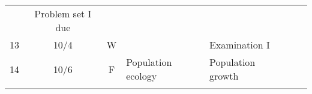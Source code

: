 \documentclass[]{article}
\begin{document}
\begin{longtable}[]{@{}cccllll@{}}
\begin{minipage}[t]{0.11\columnwidth}
\strut
\end{minipage} & \begin{minipage}[t]{0.16\columnwidth}\raggedright\strut
Problem set I due\strut
\end{minipage}\tabularnewline
\begin{minipage}[t]{0.12\columnwidth}\centering\strut
13\strut
\end{minipage} & \begin{minipage}[t]{0.08\columnwidth}\centering\strut
10/4\strut
\end{minipage} & \begin{minipage}[t]{0.07\columnwidth}\centering\strut
W\strut
\end{minipage} & \begin{minipage}[t]{0.10\columnwidth}\raggedright\strut
\strut
\end{minipage} & \begin{minipage}[t]{0.11\columnwidth}\raggedright\strut
Examination I\strut
\end{minipage} & \begin{minipage}[t]{0.11\columnwidth}\raggedright\strut
\strut
\end{minipage} & \begin{minipage}[t]{0.16\columnwidth}\raggedright\strut
\strut
\end{minipage}\tabularnewline
\begin{minipage}[t]{0.12\columnwidth}\centering\strut
14\strut
\end{minipage} & \begin{minipage}[t]{0.08\columnwidth}\centering\strut
10/6\strut
\end{minipage} & \begin{minipage}[t]{0.07\columnwidth}\centering\strut
F\strut
\end{minipage} & \begin{minipage}[t]{0.10\columnwidth}\raggedright\strut
Population ecology\strut
\end{minipage} & \begin{minipage}[t]{0.11\columnwidth}\raggedright\strut
Population growth\strut
\end{minipage} & \begin{minipage}[t]{0.11\columnwidth}\raggedright\strut
\strut
\end{minipage} & \begin{minipage}[t]{0.16\columnwidth}\raggedright\strut
\strut
\end{minipage}\tabularnewline
\begin{minipage}[t]{0.12\columnwidth}\centering\strut

\end{minipage}
\end{longtable}
\end{document}
